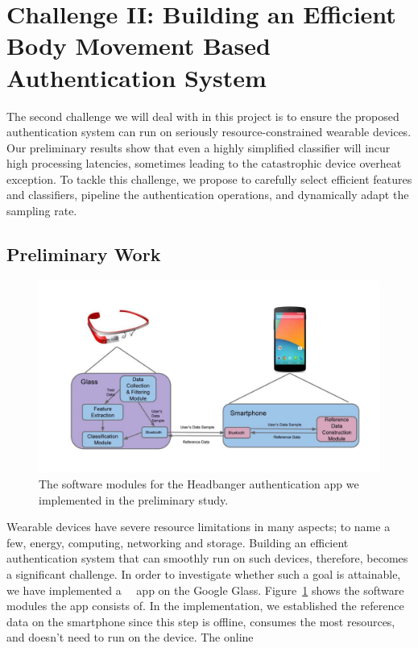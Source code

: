 \section{Challenge II: Building an Efficient Body Movement Based Authentication System}\label{sec:system}


The second challenge we will deal with in this project is to ensure the proposed authentication system can run on seriously resource-constrained wearable devices. Our preliminary results show that even a highly simplified classifier will incur high processing latencies, sometimes leading to the catastrophic device overheat exception. To tackle this challenge, we propose to carefully select efficient features and classifiers, pipeline the authentication operations, and dynamically adapt the sampling rate.

\subsection{Preliminary Work}
\begin{figure}\vspace{-12pt}
\centering
\includegraphics [width=.9\linewidth]{../figure/sofware_architecture}
\caption{The software modules for the Headbanger authentication app we implemented in the preliminary study. \label{fig:software_arch}}\vspace{-12pt}
\end{figure}
Wearable devices have severe resource limitations in many aspects; to name a few, energy, computing, networking and storage. Building an efficient authentication system that can smoothly run on such devices, therefore, becomes a significant challenge. In order to investigate whether such a goal is attainable, we have implemented a ~\systemname~app on the Google Glass. Figure~\ref{fig:software_arch} shows the software modules the app consists of. In the implementation, we established the reference data on the smartphone since this step is offline, consumes the most resources, and doesn't need to run on the device. The online
